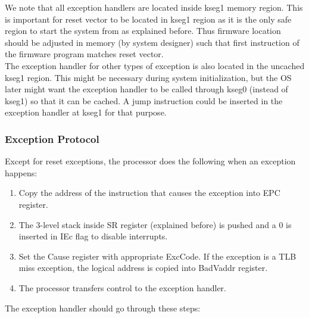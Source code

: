 \documentclass[oneside]{book}
\begin{document}
We note that all exception handlers are located inside kseg1 memory
region. This is important for reset vector to be located in kseg1
region as it is the only safe region to start the system from
as explained before. Thus firmware location should be adjusted
in memory (by system designer) such that first instruction of
the firmware program matches reset vector.\\

The exception handler for other types of exception is also located
in the uncached kseg1 region. This might be necessary during
system initialization, but the OS later might want the exception
handler to be called through kseg0 (instead of kseg1) so that
it can be cached. A jump instruction could be inserted in
the exception handler at kseg1 for that purpose.

\subsubsection{Exception Protocol}

Except for reset exceptions, the processor does the following when
an exception happens:

\begin{enumerate}

\item Copy the address of the instruction that causes the
      exception into EPC register.

\item The 3-level stack inside SR register (explained before)
      is pushed and a 0 is inserted in IEc flag to disable
      interrupts.

\item Set the Cause register with appropriate ExcCode. If
      the exception is a TLB miss exception, the logical
      address is copied into BadVaddr register.

\item The processor transfers control to the exception handler.

\end{enumerate}

The exception handler should go through these steps:
\end{document}
